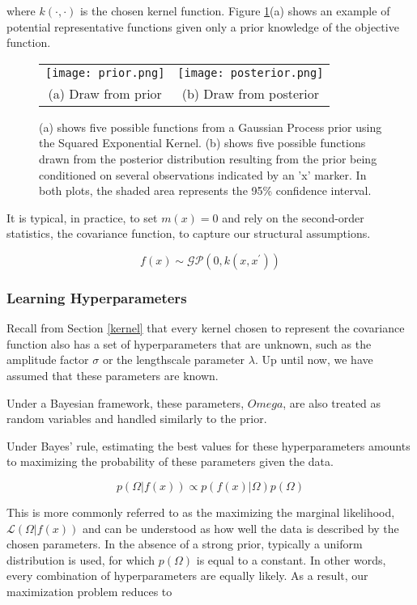 where $k(\cdot,\cdot)$ is the chosen kernel function. Figure \ref{fig:BayesGP}(a) shows an example of potential representative functions given only a prior knowledge of the objective function.


\begin{figure}
	\centering
	\begin{tabular}{cc}
		\texttt{[image: prior.png]} &
		\texttt{[image: posterior.png]}\\
		(a) Draw from prior & (b) Draw from posterior
	\end{tabular}
	\caption{(a) shows five possible functions from a Gaussian Process prior using the Squared Exponential Kernel. (b) shows five possible functions drawn from the posterior distribution resulting from the prior being conditioned on several observations indicated by an 'x' marker. In both plots, the shaded area represents the 95\% confidence interval.}
	\label{fig:BayesGP}
\end{figure}

It is typical, in practice, to set $m(x)=0$ and rely on the second-order statistics, the covariance function, to capture our structural assumptions.

\begin{equation}
f(x) \sim \mathcal{GP}(0,k(x,x^\prime))
\end{equation}

\subsubsection{Learning Hyperparameters}

Recall from Section \ref{kernel} that every kernel chosen to represent the covariance function also has a set of hyperparameters that are unknown, such as the amplitude factor $\sigma$ or the lengthscale parameter $\lambda$. Up until now, we have assumed that these parameters are known.

Under a Bayesian framework, these parameters, $Omega$, are also treated as random variables and handled similarly to the prior. 

Under Bayes' rule, estimating the best values for these hyperparameters amounts to maximizing the probability of these parameters given the data.

\begin{equation}
p(\Omega|f(x)) \propto p(f(x)|\Omega)p(\Omega)
\end{equation}

This is more commonly referred to as the maximizing the marginal likelihood, $\mathcal{L}(\Omega|f(x))$ and can be understood as how well the data is described by the chosen parameters. In the absence of a strong prior, typically a uniform distribution is used, for which $p(\Omega)$ is equal to a constant. In other words, every combination of hyperparameters are equally likely. As a result, our maximization problem reduces to

